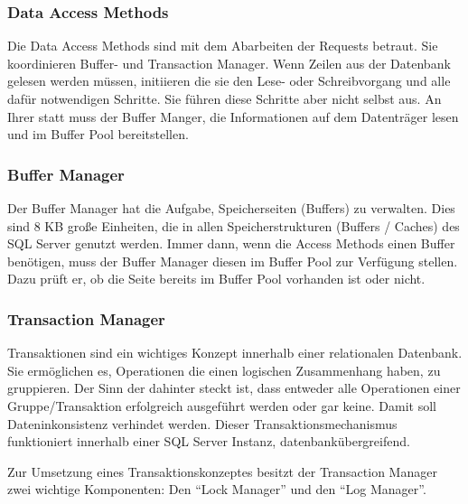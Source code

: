         \subsubsection{Data Access Methods}
          Die Data Access Methods sind mit dem Abarbeiten der Requests betraut.
          Sie koordinieren Buffer- und Transaction Manager. Wenn Zeilen aus der
          Datenbank gelesen werden müssen, initiieren die sie den Lese-
          oder Schreibvorgang und alle dafür notwendigen Schritte. Sie führen
          diese Schritte aber nicht selbst aus. An Ihrer statt muss der Buffer Manger, die
          Informationen auf dem Datenträger lesen und im Buffer Pool
          bereitstellen.
        \subsubsection{Buffer Manager}
          Der Buffer Manager hat die Aufgabe, Speicherseiten (Buffers) zu
          verwalten. Dies sind 8 KB große Einheiten, die in allen
          Speicherstrukturen (Buffers / Caches) des SQL Server genutzt
          werden. Immer dann, wenn die Access Methods einen Buffer
          benötigen, muss der Buffer Manager diesen im Buffer Pool zur
          Verfügung stellen. Dazu prüft er, ob die Seite bereits im Buffer
          Pool vorhanden ist oder nicht. 
        \subsubsection{Transaction Manager} 
          Transaktionen sind ein wichtiges Konzept innerhalb einer relationalen
          Datenbank. Sie ermöglichen es, Operationen die einen logischen
          Zusammenhang haben, zu gruppieren. Der Sinn der dahinter steckt ist,
          dass entweder alle Operationen einer Gruppe/Transaktion erfolgreich
          ausgeführt werden oder gar keine. Damit soll Dateninkonsistenz
          verhindet werden. Dieser Transaktionsmechanismus funktioniert
          innerhalb einer SQL Server Instanz, datenbankübergreifend.
          
          Zur Umsetzung eines Transaktionskonzeptes besitzt der Transaction
          Manager zwei wichtige Komponenten: Den \enquote{Lock Manager} und den
          \enquote{Log Manager}.
